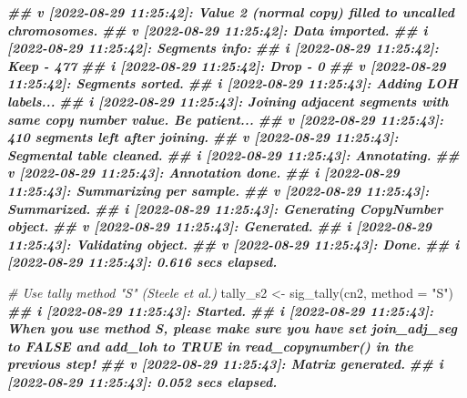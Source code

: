 \documentclass[
  12pt,
  a4paper,
  twoside]{book}
\newenvironment{Shaded}{\begin{snugshade}}{\end{snugshade}}
\newcommand{\AttributeTok}[1]{\textcolor[rgb]{0.77,0.63,0.00}{#1}}
\newcommand{\CommentTok}[1]{\textcolor[rgb]{0.56,0.35,0.01}{\textit{#1}}}
\newcommand{\DocumentationTok}[1]{\textcolor[rgb]{0.56,0.35,0.01}{\textbf{\textit{#1}}}}
\newcommand{\FunctionTok}[1]{\textcolor[rgb]{0.00,0.00,0.00}{#1}}
\newcommand{\NormalTok}[1]{#1}
\newcommand{\OtherTok}[1]{\textcolor[rgb]{0.56,0.35,0.01}{#1}}
\newcommand{\StringTok}[1]{\textcolor[rgb]{0.31,0.60,0.02}{#1}}
\begin{document}
\begin{Shaded}
\begin{Highlighting}[]
\DocumentationTok{\#\# v [2022{-}08{-}29 11:25:42]: Value 2 (normal copy) filled to uncalled chromosomes.}
\DocumentationTok{\#\# v [2022{-}08{-}29 11:25:42]: Data imported.}
\DocumentationTok{\#\# i [2022{-}08{-}29 11:25:42]: Segments info:}
\DocumentationTok{\#\# i [2022{-}08{-}29 11:25:42]:     Keep {-} 477}
\DocumentationTok{\#\# i [2022{-}08{-}29 11:25:42]:     Drop {-} 0}
\DocumentationTok{\#\# v [2022{-}08{-}29 11:25:42]: Segments sorted.}
\DocumentationTok{\#\# i [2022{-}08{-}29 11:25:43]: Adding LOH labels...}
\DocumentationTok{\#\# i [2022{-}08{-}29 11:25:43]: Joining adjacent segments with same copy number value. Be patient...}
\DocumentationTok{\#\# v [2022{-}08{-}29 11:25:43]: 410 segments left after joining.}
\DocumentationTok{\#\# v [2022{-}08{-}29 11:25:43]: Segmental table cleaned.}
\DocumentationTok{\#\# i [2022{-}08{-}29 11:25:43]: Annotating.}
\DocumentationTok{\#\# v [2022{-}08{-}29 11:25:43]: Annotation done.}
\DocumentationTok{\#\# i [2022{-}08{-}29 11:25:43]: Summarizing per sample.}
\DocumentationTok{\#\# v [2022{-}08{-}29 11:25:43]: Summarized.}
\DocumentationTok{\#\# i [2022{-}08{-}29 11:25:43]: Generating CopyNumber object.}
\DocumentationTok{\#\# v [2022{-}08{-}29 11:25:43]: Generated.}
\DocumentationTok{\#\# i [2022{-}08{-}29 11:25:43]: Validating object.}
\DocumentationTok{\#\# v [2022{-}08{-}29 11:25:43]: Done.}
\DocumentationTok{\#\# i [2022{-}08{-}29 11:25:43]: 0.616 secs elapsed.}

\CommentTok{\# Use tally method "S" (Steele et al.)}
\NormalTok{tally\_s2 }\OtherTok{\textless{}{-}} \FunctionTok{sig\_tally}\NormalTok{(cn2, }\AttributeTok{method =} \StringTok{"S"}\NormalTok{)}
\DocumentationTok{\#\# i [2022{-}08{-}29 11:25:43]: Started.}
\DocumentationTok{\#\# i [2022{-}08{-}29 11:25:43]: When you use method \textquotesingle{}S\textquotesingle{}, please make sure you have set \textquotesingle{}join\_adj\_seg\textquotesingle{} to FALSE and \textquotesingle{}add\_loh\textquotesingle{} to TRUE in \textquotesingle{}read\_copynumber() in the previous step!}
\DocumentationTok{\#\# v [2022{-}08{-}29 11:25:43]: Matrix generated.}
\DocumentationTok{\#\# i [2022{-}08{-}29 11:25:43]: 0.052 secs elapsed.}


\end{Highlighting}
\end{Shaded}
\end{document}
